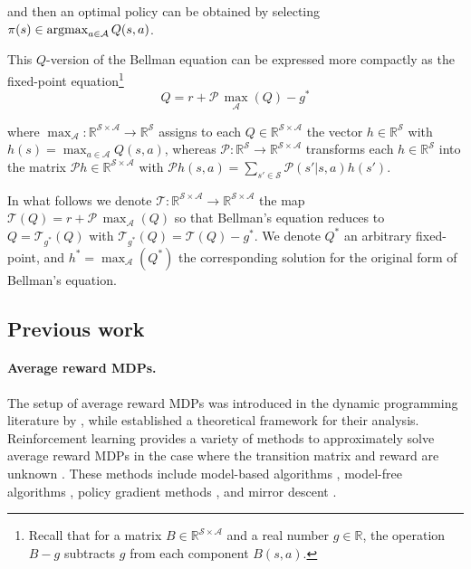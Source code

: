 \documentclass{article}
\newcommand{\Argmax}{\mathop{\rm argmax}}
\newcommand{\cA}{\mathcal{A}}
\newcommand{\cS}{\mathcal{S}}
\newcommand{\cP}{\mathcal{P} }
\newcommand{\T}{\mathcal{T}}
\newcommand{\reals}{\mathbb{R}}
\newcommand{\maxA}{\mbox{$\max_\cA$}}
\newcommand{\R}{r}
\theoremstyle{plain}
\theoremstyle{definition}
\theoremstyle{remark}
\begin{document}
\vspace{-3ex}
and then an optimal policy can  be obtained by selecting  $\pi(s)\in\Argmax_{a\in\cA}Q(s,a)$. 

This $Q$-version of the Bellman equation can be expressed more compactly  as the fixed-point equation\footnote{Recall that for a matrix $B\in\reals^{\cS\times\cA}$ and a real number $g\in\reals$, the operation $B-g$ subtracts $g$ from each component $B(s,a)$.}
\vspace{-1ex}
$$Q=r+\cP\,\maxA(Q)-g^*$$

\vspace{-2ex}
where $\maxA:\reals^{\cS\times\cA}\to \reals^{\cS}$ assigns to  each $Q\in  \reals^{\cS\times\cA}$ the vector $h\in\reals^\cS$ with $h(s)=\max_{a\in\cA} Q(s,a)$, 
whereas $\cP :\reals^\cS\to\reals^{\cS\times\cA}$ transforms each $h\in \reals^\cS$ into the matrix  $\cP h\in\reals^{\cS\times\cA}$ with $\cP h(s,a)=\sum_{s'\in\cS}\cP(s'|s,a)h(s')$.

In what follows we denote $\T:\reals^{\cS\times\cA}\to \reals^{\cS\times\cA}$ the map $\T(Q)=\R+\cP\,\maxA(Q)$ 
so that Bellman's equation reduces to $Q=\T_{g^*}(Q)$
with $\T_{g^*}(Q)=\T(Q)-g^*$.  
We denote $Q^*$ an arbitrary fixed-point, and $h^*=\maxA(Q^*)$
the corresponding solution for the original form of Bellman's equation.


\subsection{Previous work} \label{sec:prev_work}
\paragraph{Average reward MDPs.}
The setup of average reward MDPs was introduced  in the dynamic programming literature by \citet{howard1960dynamic}, while \citet{blackwell1962discrete} established a theoretical framework for their analysis. Reinforcement learning provides a variety of methods to approximately solve average reward MDPs in the case where the transition matrix and reward are unknown \citep{mahadevan1996average, dewanto2020average}. These methods include model-based algorithms \citep{jin2021towards, zurek2024span}, model-free algorithms \citep{wei2020model, wan2021learning}, policy gradient methods \citep{bai2024regret, kumar2024global}, and mirror descent  \citep{murthy2023convergence}. 
\end{document}
